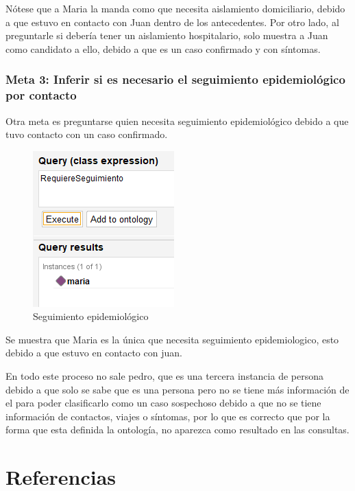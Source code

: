 \documentclass[11pt, letterpaper]{article}
\begin{document}
Nótese que a Maria la manda como que necesita aislamiento domiciliario, debido a que estuvo en contacto con Juan dentro de los antecedentes. Por otro lado, al preguntarle si debería tener un aislamiento hospitalario, solo muestra a Juan como candidato a ello, debido a que es un caso confirmado y con síntomas.

		
\newpage

\subsubsection{Meta 3: Inferir si es necesario el seguimiento epidemiológico por contacto}

Otra meta es preguntarse quien necesita seguimiento epidemiológico debido a que tuvo contacto con un caso confirmado.

\begin{figure}[!h]
	\centering
	\includegraphics[width=0.5\linewidth]{IMG/R7}
	\caption{Seguimiento epidemiológico}
	\label{fig:r7}
\end{figure}

Se muestra que Maria es la única que necesita seguimiento epidemiologico, esto debido a que estuvo en contacto con juan.

En todo este proceso no sale pedro, que es una tercera instancia de persona debido a que solo se sabe que es una persona pero no se tiene más información de el para poder clasificarlo como un caso sospechoso debido a que no se tiene información de contactos, viajes o síntomas, por lo que es correcto que por la forma que esta definida la ontología, no aparezca como resultado en las consultas.


\newpage


\section{Referencias}  %

	
\end{document}
